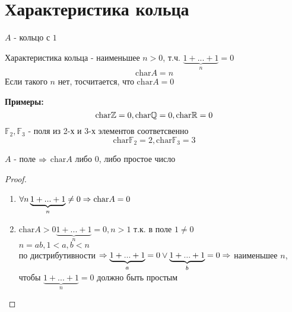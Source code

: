 \section{Характеристика кольца}
$A$ - кольцо с $1$\\

\begin{Def}
	Характеристика кольца - наименьшее $n > 0$, т.ч. $\underbrace{1+...+1}_{n} = 0$
		$$ \mathrm{char} A = n $$
	Если такого $n$ нет, тосчитается, что $\mathrm{char} A = 0$\\
\end{Def}

\textbf{Примеры:}
	$$ \mathrm{char} \mathbb{Z} = 0, \mathrm{char} \mathbb{Q} = 0, \mathrm{char} \mathbb{R} = 0 $$
	$ \mathbb{F}_2, \mathbb{F}_3$ - поля из 2-х и 3-х элементов соответсвенно\\
	$$ \mathrm{char} \mathbb{F}_2 = 2, \mathrm{char} \mathbb{F}_3 = 3 $$

\begin{Rem} 
	$A$ - поле $\Rightarrow$ $\mathrm{char} A$ либо $0$, либо простое число
\end{Rem}

\begin{proof}
	\begin{enumerate}
	\item $\forall n \underbrace{1 + ... + 1}_{n} \neq 0 \Rightarrow \mathrm{char} A = 0$
	\item $\mathrm{char} A > 0 \underbrace{1 + ... + 1}_{n} = 0, n > 1$ т.к. в поле $1 \neq 0$\\
	$n = ab, 1 < a, b < n$ \\
	по дистрибутивности $\Rightarrow \underbrace{1+...+1}_a = 0 \vee \underbrace{1+...+1}_b = 0 \Rightarrow$
	наименьшее $n$, чтобы $\underbrace{1 + ... + 1}_{n} = 0$ должно быть простым
	\end{enumerate}
\end{proof}
